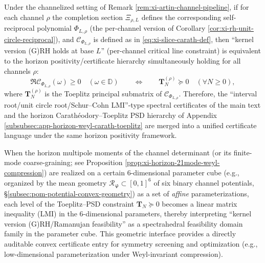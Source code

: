 \begin{corollary}\label{cor:xi-channel-horizon-toeplitz-certificate}
Under the channelized setting of Remark \ref{rem:xi-artin-channel-pipeline}, if for each channel \(\rho\) the completion section \(\Xi_{\rho,L}\) defines the corresponding self-reciprocal polynomial \(\Phi_{L,\rho}\) (the per-channel version of Corollary \ref{cor:xi-rh-unit-circle-reciprocal}), and \(\mathscr{C}_{\Phi_{L,\rho}}\) is defined as in \eqref{eq:xi-slice-carath-def},
then ``kernel version (G)RH holds at base \(L\)'' (per-channel critical line constraint) is equivalent to the horizon positivity/certificate hierarchy simultaneously holding for all channels \(\rho\):
\[
\Re\mathscr{C}_{\Phi_{L,\rho}}(\omega)\ge 0\quad(\omega\in\mathbb{D})
\qquad\Longleftrightarrow\qquad
\mathbf{T}^{(\rho)}_N\succeq 0\quad(\forall N\ge 0),
\]
where \(\mathbf{T}^{(\rho)}_N\) is the Toeplitz principal submatrix of \(\mathscr{C}_{\Phi_{L,\rho}}\).
Therefore, the ``interval root/unit circle root/Schur--Cohn LMI''-type spectral certificates of the main text and the horizon Carath\'eodory--Toeplitz PSD hierarchy of Appendix \ref{subsubsec:app-horizon-weyl-carath-toeplitz} are merged into a unified certificate language under the same horizon positivity framework.
\end{corollary}

\begin{remark}\label{rem:xi-6d-parameter-spectrahedral-feasible}
When the horizon multipole moments of the channel determinant (or its finite-mode coarse-graining; see Proposition \ref{prop:xi-horizon-21mode-weyl-compression}) are realized on a certain \(6\)-dimensional parameter cube (e.g., organized by the mean geometry \(\mathcal{R}_{\boldsymbol{\varphi}}\subset[0,1]^6\) of six binary channel potentials, \S\ref{subsec:pom-potential-convex-geometry}) as a set of \emph{affine} parameterizations,
each level of the Toeplitz--PSD constraint \(\mathbf{T}_N\succeq 0\) becomes a linear matrix inequality (LMI) in the \(6\)-dimensional parameters, thereby interpreting ``kernel version (G)RH/Ramanujan feasibility'' as a spectrahedral feasibility domain family in the parameter cube.
This geometric interface provides a directly auditable convex certificate entry for symmetry screening and optimization (e.g., low-dimensional parameterization under Weyl-invariant compression).
\end{remark}

